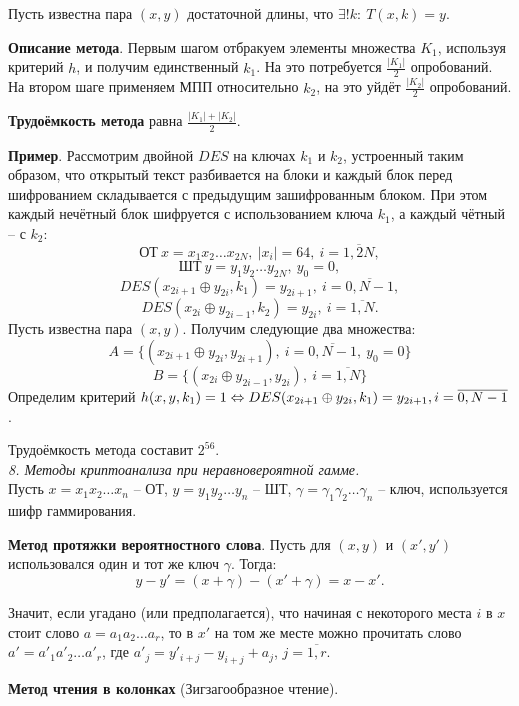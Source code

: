 Пусть известна пара $(x, y)$ достаточной длины, что $\exists ! k:\ T(x, k) = y$.

\textbf{Описание метода}. Первым шагом отбракуем элементы множества $K_1$, используя критерий $h$, и получим единственный $k_1$. На это потребуется $\frac{|K_1|}{2}$ опробований. На втором шаге применяем МПП относительно $k_2$, на это уйдёт $\frac{|K_2|}{2}$ опробований.

\textbf{Трудоёмкость метода} равна $\frac{|K_1| + |K_2|}{2}$.

\textbf{Пример}. Рассмотрим двойной $DES$ на ключах $k_1$ и $k_2$, устроенный таким образом, что открытый текст разбивается на блоки и каждый блок перед шифрованием складывается с предыдущим зашифрованным блоком. При этом каждый нечётный блок шифруется с использованием ключа $k_1$, а каждый чётный -- с $k_2$:
$$ОТ\ x = x_1 x_2 \ldots x_{2N},\ |x_i| = 64,\ i = \overline{1, 2N},$$
$$ШТ\ y = y_1 y_2 \ldots y_{2N},\ y_0 = 0,$$
$$DES(x_{2i+1} \oplus y_{2i}, k_1) = y_{2i+1},\ i = \overline{0, N-1},$$
$$DES(x_{2i} \oplus y_{2i-1}, k_2) = y_{2i},\ i = \overline{1, N}.$$
Пусть известна пара $(x, y)$. Получим следующие два множества:
$$A = \{(x_{2i+1} \oplus y_{2i}, y_{2i+1}),\ i = \overline{0, N-1},\ y_0 = 0\}$$
$$B = \{(x_{2i} \oplus y_{2i-1}, y_{2i}),\ i = \overline{1, N}\}$$
Определим критерий $h(x, y, k_1) = 1 \Leftrightarrow DES(x_{2i+1} \oplus y_{2i}, k_1) = y_{2i+1},\\ i = \overline{0, N-1}$.

Трудоёмкость метода составит $2^{56}$. \\

\noindent \textit{8. Методы криптоанализа при неравновероятной гамме.} \\

Пусть $x = x_1 x_2 \ldots x_n$ -- ОТ, $y = y_1 y_2 \ldots y_n$ -- ШТ, $\gamma = \gamma_1 \gamma_2 \ldots \gamma_n$ -- ключ, используется шифр гаммирования.

\textbf{Метод протяжки вероятностного слова}. Пусть для $(x, y)$ и $(x', y')$ использовался один и тот же ключ $\gamma$. Тогда:
$$y - y' = (x + \gamma) - (x' + \gamma) = x - x'.$$

\noindent Значит, если угадано (или предполагается), что начиная с некоторого места $i$ в $x$ стоит слово $a = a_1 a_2 \ldots a_r$, то в $x'$ на том же месте можно прочитать слово $a' = a'_1 a'_2 \ldots a'_r$, где $a'_j = y'_{i+j} - y_{i+j} + a_j$, $j = \overline{1, r}$.

\textbf{Метод чтения в колонках} (Зигзагообразное чтение). \\

